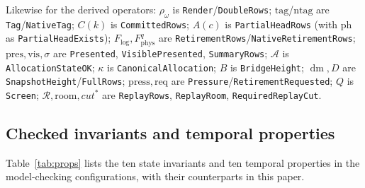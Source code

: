 \documentclass[11pt]{article}
\newcommand{\ren}[1]{\rho_{#1}}
\newcommand{\tg}{\mathrm{tag}}
\newcommand{\ntg}{\mathrm{ntag}}
\newcommand{\pres}{\mathrm{pres}}
\newcommand{\vis}{\mathrm{vis}}
\newcommand{\AOK}{\mathcal{A}}
\newcommand{\Canon}{\kappa}
\newcommand{\Press}{\mathrm{press}}
\newcommand{\Req}{\mathrm{req}}
\newcommand{\PH}{\mathrm{ph}}
\newcommand{\RRows}{\mathcal{R}}
\newcommand{\Room}{\mathrm{room}}
\newcommand{\Scr}{Q}
\newcommand{\rcut}{\mathit{cut}}
\DeclareMathOperator{\dm}{dm}
\newcommand{\tla}[1]{\texttt{#1}}
\theoremstyle{definition}
\theoremstyle{remark}
\begin{document}
Likewise for the derived operators: $\ren{\omega}$ is
\tla{Render}/\tla{DoubleRows}; $\tg$/$\ntg$ are \tla{Tag}/\tla{NativeTag};
$C(k)$ is \tla{CommittedRows}; $A(c)$ is \tla{PartialHeadRows} (with $\PH$
as \tla{PartialHeadExists}); $F_{\log},F^{q}_{\mathrm{phys}}$ are
\tla{RetirementRows}/\tla{NativeRetirementRows}; $\pres,\vis,\sigma$ are
\tla{Presented}, \tla{VisiblePresented}, \tla{SummaryRows}; $\AOK$ is
\tla{AllocationStateOK}; $\Canon$ is \tla{CanonicalAllocation}; $B$ is
\tla{BridgeHeight}; $\dm,D$ are \tla{SnapshotHeight}/\tla{FullRows};
$\Press,\Req$ are \tla{Pressure}/\tla{RetirementRequested}; $\Scr$ is
\tla{Screen}; $\RRows,\Room,\rcut^{*}$ are \tla{ReplayRows},
\tla{ReplayRoom}, \tla{RequiredReplayCut}.

\subsection{Checked invariants and temporal properties}

Table~\ref{tab:props} lists the ten state invariants and ten temporal
properties in the model-checking configurations, with their counterparts in
this paper.
\end{document}
